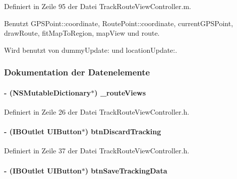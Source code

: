 Definiert in Zeile 95 der Datei TrackRouteViewController.m.

Benutzt GPSPoint::coordinate, RoutePoint::coordinate, currentGPSPoint, drawRoute, fitMapToRegion, mapView und route.

Wird benutzt von dummyUpdate: und locationUpdate:.

\subsubsection{Dokumentation der Datenelemente}
\hypertarget{interface_track_route_view_controller_a0048826a66f9f97e05c950c9cdb8efe9}{
\paragraph[{\_\-routeViews}]{\setlength{\rightskip}{0pt plus 5cm}-\/ (NSMutableDictionary$\ast$) {\bf \_\-routeViews}}\hfill}
\label{interface_track_route_view_controller_a0048826a66f9f97e05c950c9cdb8efe9}


Definiert in Zeile 26 der Datei TrackRouteViewController.h.\hypertarget{interface_track_route_view_controller_ab96d243d196054d287fc27b9e4f21c11}{
\paragraph[{btnDiscardTracking}]{\setlength{\rightskip}{0pt plus 5cm}-\/ (IBOutlet UIButton$\ast$) {\bf btnDiscardTracking}}\hfill}
\label{interface_track_route_view_controller_ab96d243d196054d287fc27b9e4f21c11}


Definiert in Zeile 37 der Datei TrackRouteViewController.h.\hypertarget{interface_track_route_view_controller_a746c3e70dcd66a9aebd7728c2446d5b6}{
\paragraph[{btnSaveTrackingData}]{\setlength{\rightskip}{0pt plus 5cm}-\/ (IBOutlet UIButton$\ast$) {\bf btnSaveTrackingData}}\hfill}
\label{interface_track_route_view_controller_a746c3e70dcd66a9aebd7728c2446d5b6}


